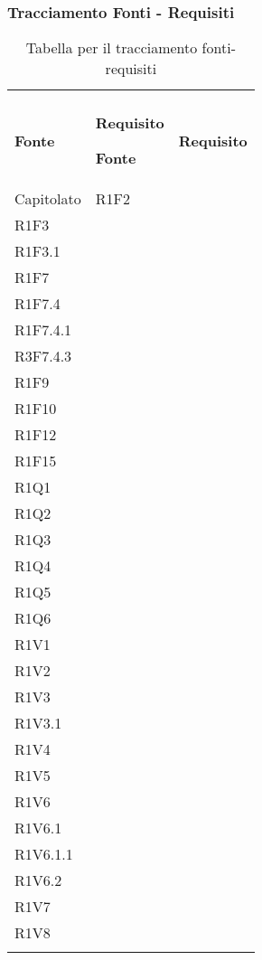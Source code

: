 \subsubsection{Tracciamento Fonti - Requisiti}

\renewcommand{\arraystretch}{2.2}

\begin{longtable}{|C{6.5cm}|C{6.5cm}|}

	\caption{Tabella per il tracciamento fonti-requisiti}\\
	\textbf{Fonte} & \textbf{Requisito}
	\endfirsthead

	\hline
	\textbf{Fonte} & \textbf{Requisito}
	\tabularnewline
	\endhead

	Capitolato &
	\centering
	R1F2\\
	R1F3 \\
	R1F3.1\\
	R1F7\\
	R1F7.4\\
	R1F7.4.1\\
	R3F7.4.3\\
	R1F9\\
	R1F10\\
	R1F12\\
	R1F15\\
	R1Q1\\
	R1Q2\\
	R1Q3\\
	R1Q4\\
	R1Q5\\
	R1Q6\\
	R1V1\\
	R1V2\\
	R1V3\\
	R1V3.1\\
	R1V4\\
	R1V5\\
	R1V6\\
	R1V6.1\\
	R1V6.1.1\\
	R1V6.2\\
	R1V7\\
	R1V8\\

	\tabularnewline


\end{longtable}
